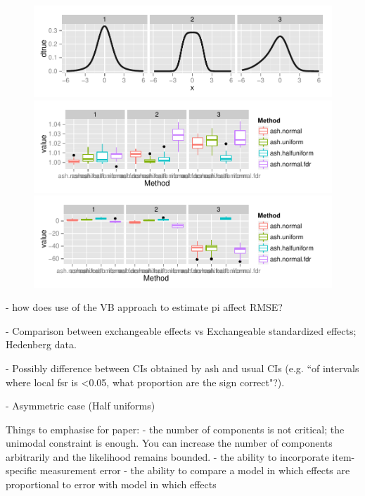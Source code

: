 \documentclass[10pt]{article}
\begin{document}
\begin{figure}[!ht] \label{fig:rmse_loglik_boxplot}
\begin{center}
\includegraphics[width=6.5in]{Rcode/figures/simABC_egdens.pdf}
\includegraphics[width=6.5in]{Rcode/figures/rmse_boxplot.pdf}
\includegraphics[width=6.5in]{Rcode/figures/loglik_boxplot.pdf}
\end{center}
\caption{}
\end{figure}

- how does use of the VB approach to estimate pi affect RMSE?

- Comparison between exchangeable effects vs Exchangeable standardized effects; Hedenberg data. 

- Possibly difference between CIs obtained by ash and usual CIs (e.g. ``of intervals where local fsr is <0.05, what proportion are the sign correct"?).


- Asymmetric case (Half uniforms)

Things to emphasise for paper:
- the number of components is not critical; the unimodal constraint is enough. You can increase the number of components arbitrarily and the likelihood remains bounded.
- the ability to incorporate item-specific measurement error
- the ability to compare a model in which effects are proportional to error
with model in which effects 
\end{document}
